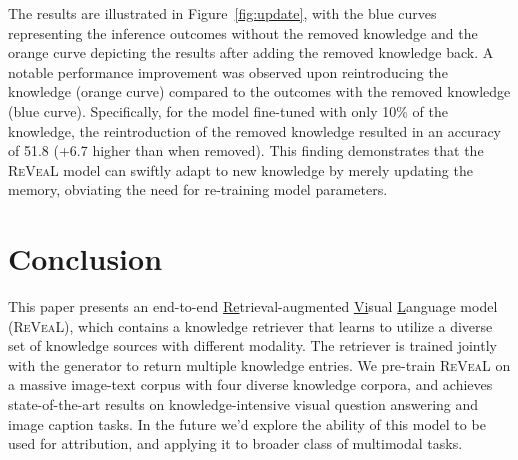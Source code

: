 \documentclass[10pt,twocolumn,letterpaper]{article}
\newcommand{\method}{R\textsc{e}V\textsc{ea}L\xspace}
\begin{document}
The results are illustrated in Figure~\ref{fig:update}, with the blue curves representing the inference outcomes without the removed knowledge and the orange curve depicting the results after adding the removed knowledge back. 
A notable performance improvement was observed upon reintroducing the knowledge (orange curve) compared to the outcomes with the removed knowledge (blue curve). Specifically, for the model fine-tuned with only 10\% of the knowledge, the reintroduction of the removed knowledge resulted in an accuracy of 51.8 (+6.7 higher than when removed). This finding demonstrates that the \method model can swiftly adapt to new knowledge by merely updating the memory, obviating the need for re-training model parameters.
























 \section{Conclusion}\label{sec:conclusion}

This paper presents an end-to-end \underline{Re}trieval-augmented \underline{Vi}sual \underline{L}anguage model (\method), which contains a knowledge retriever that learns to utilize a diverse set of knowledge sources with different modality. The retriever is trained jointly with the generator to return multiple knowledge entries. 
We pre-train \method on a massive image-text corpus with four diverse knowledge corpora, and achieves state-of-the-art results on knowledge-intensive visual question answering and image caption tasks.
In the future we'd explore the ability of this model to be used for attribution, and applying it to broader class of multimodal tasks.

%
 

{\small


}
\end{document}
